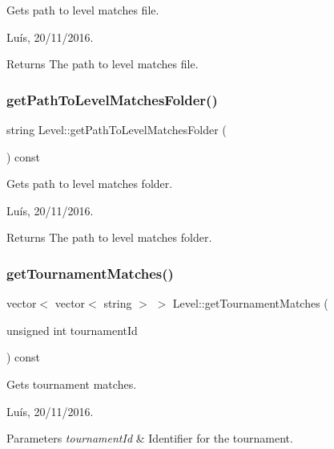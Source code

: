 Gets path to level matches file. 

Luís, 20/11/2016. 

\begin{DoxyReturn}{Returns}
The path to level matches file. 
\end{DoxyReturn}
\hypertarget{class_level_a5808d2312d1b6c2f93dbbd0b47c97499}{}\label{class_level_a5808d2312d1b6c2f93dbbd0b47c97499} 
\subsubsection{\texorpdfstring{get\+Path\+To\+Level\+Matches\+Folder()}{getPathToLevelMatchesFolder()}}
{\footnotesize\ttfamily string Level\+::get\+Path\+To\+Level\+Matches\+Folder (\begin{DoxyParamCaption}{ }\end{DoxyParamCaption}) const}



Gets path to level matches folder. 

Luís, 20/11/2016. 

\begin{DoxyReturn}{Returns}
The path to level matches folder. 
\end{DoxyReturn}
\hypertarget{class_level_a71eeac219eb35734461d2fec5ea69f65}{}\label{class_level_a71eeac219eb35734461d2fec5ea69f65} 
\subsubsection{\texorpdfstring{get\+Tournament\+Matches()}{getTournamentMatches()}}
{\footnotesize\ttfamily vector$<$ vector$<$ string $>$ $>$ Level\+::get\+Tournament\+Matches (\begin{DoxyParamCaption}\item[{unsigned int}]{tournament\+Id }\end{DoxyParamCaption}) const}



Gets tournament matches. 

Luís, 20/11/2016. 


\begin{DoxyParams}{Parameters}
{\em tournament\+Id} & Identifier for the tournament. \\
\hline
\end{DoxyParams}


